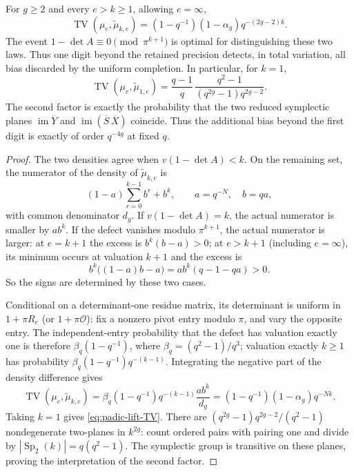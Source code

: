 \begin{theorem}
\label{thm:padic-lift-exact}
For $g\geq2$ and every $e>k\geq1$, allowing $e=\infty$,
\begin{equation}\label{eq:padic-all-levels-TV}
 \operatorname{TV}(\mu_e,\widetilde\mu_{k,e})
 =(1-q^{-1})(1-\alpha_g)q^{-(2g-2)k}.
\end{equation}
The event $1-\det A\equiv0\pmod{\pi^{k+1}}$ is optimal for
distinguishing these two laws. Thus one digit beyond the retained
precision detects, in total variation, all bias discarded by the
uniform completion. In particular, for $k=1$,
\begin{equation}\label{eq:padic-lift-TV}
 \operatorname{TV}(\mu_e,\widetilde\mu_{1,e})
 =\frac{q-1}{q}\,
 \frac{q^2-1}{(q^{2g}-1)q^{2g-2}}.
\end{equation}
The second factor is exactly the probability that the two reduced
symplectic planes $\operatorname{im}\overline Y$ and
$\operatorname{im}(\overline S\,\overline X)$ coincide. Thus the
additional bias beyond the first digit is exactly of order $q^{-4g}$
at fixed $q$.
\end{theorem}

\begin{proof}
The two densities agree when $v(1-\det A)<k$. On the remaining set,
the numerator of the density of $\widetilde\mu_{k,e}$ is
\[
 (1-a)\sum_{r=0}^{k-1}b^r+b^k,\qquad
 a=q^{-N},\quad b=qa,
\]
with common denominator $d_g$. If $v(1-\det A)=k$, the actual
numerator is smaller by $ab^k$. If the defect vanishes modulo
$\pi^{k+1}$, the actual numerator is larger: at $e=k+1$ the excess
is $b^k(b-a)>0$; at $e>k+1$ (including $e=\infty$), its minimum
occurs at valuation $k+1$ and the excess is
\[
 b^k\bigl((1-a)b-a\bigr)=ab^k(q-1-qa)>0.
\]
So the signs are determined by these two cases.

Conditional on a determinant-one residue matrix, its determinant is
uniform in $1+\pi R_e$ (or $1+\pi\mathcal O$): fix a nonzero pivot
entry modulo $\pi$, and vary the opposite entry. The independent-entry
probability that the defect has valuation exactly one is therefore
$\beta_q(1-q^{-1})$, where $\beta_q=(q^2-1)/q^3$; valuation exactly
$k\geq1$ has probability $\beta_q(1-q^{-1})q^{-(k-1)}$.
Integrating the negative part of the density difference gives
\[
 \operatorname{TV}(\mu_e,\widetilde\mu_{k,e})
 =\beta_q(1-q^{-1})q^{-(k-1)}\frac{ab^k}{d_g}
 =(1-q^{-1})(1-\alpha_g)q^{-Nk}.
\]
Taking $k=1$ gives \eqref{eq:padic-lift-TV}.
There are $(q^{2g}-1)q^{2g-2}/(q^2-1)$ nondegenerate two-planes in
$k^{2g}$: count ordered pairs with pairing one and divide by
$|\operatorname{Sp}_2(k)|=q(q^2-1)$. The symplectic group is transitive
on these planes, proving the interpretation of the second factor.
\end{proof}

